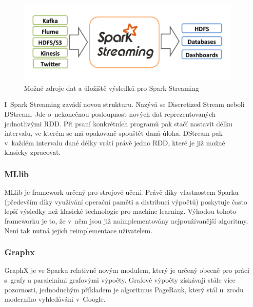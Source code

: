 \documentclass[thesis=B,czech]{FITthesis}[2012/06/26]
\begin{document}
	\begin{figure}[ht]
    	\centering
    	\includegraphics[width=1\textwidth]{images/spark-streaming-arch.png}
    	\caption{Možné zdroje dat a úložiště výsledků pro Spark Streaming\cite{streaming-guide}}
    	\label{fig:spark_streaming_arch}
	\end{figure}
	
	I~Spark Streaming zavádí novou strukturu. Nazývá se Discretized Stream neboli DStream. Jde o~nekonečnou posloupnost nových dat reprezentovaných jednotlivými RDD. Při psaní konkrétních programů pak stačí nastavit délku intervalu, ve kterém se má opakovaně spouštět daná úloha. DStream pak v~každém intervalu dané délky vrátí právě jedno RDD, které je již možné klasicky zpracovat. 
	

\subsubsection{MLlib}
	MLlib je framework určený pro strojové učení. Právě díky vlastnostem Sparku (především díky využívání operační paměti a distribuci výpočtů) poskytuje často lepší výsledky než klasické technologie pro machine learning\cite{MLlib}. Výhodou tohoto frameworku je to, že v~něm jsou již naimplementovány nejpoužívanější algoritmy. Není tak nutná jejich reimplementace uživatelem. 

	
\subsubsection{Graphx}
	GraphX je ve Sparku relativně novým modulem, který je určený obecně pro práci s~grafy a paralelními grafovými výpočty. Grafové výpočty získávají stále více pozornosti, jednoduchým příkladem je algoritmus PageRank, který stál u~zrodu moderního vyhledávání v~Google\cite{google-pagerank}. 
	


\end{document}
